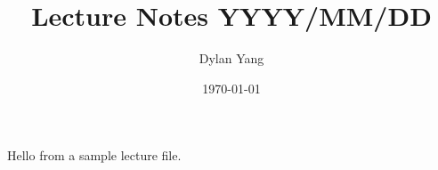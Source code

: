 \documentclass[../main.tex]{subfiles}
\title{Lecture Notes YYYY/MM/DD}
\author{Dylan Yang}
\date{\today}
\begin{document}
\ifSubfilesClassLoaded{\maketitle}{}

Hello from a sample lecture file.
\end{document}
